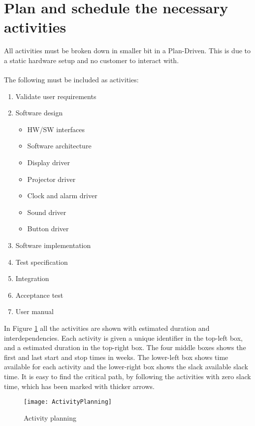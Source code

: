 \documentclass[Main]{subfiles}
\begin{document}
\section{Plan and schedule the necessary activities} 

All activities must be broken down in smaller bit in a Plan-Driven.
This is due to a static hardware setup and no customer to interact with.
\\
\\
The following must be included as activities:
\begin{enumerate}
	\item Validate user requirements
	\item Software design
	\begin{itemize}
		\item HW/SW interfaces
		\item Software architecture
		\item Display driver
		\item Projector driver
		\item Clock and alarm driver
		\item Sound driver
		\item Button driver
	\end{itemize}
	\item Software implementation
	\item Test specification
	\item Integration
	\item Acceptance test
	\item User manual
\end{enumerate}

In Figure \ref{fig:activityPlanning} all the activities are shown with estimated duration and interdependencies. Each activity is given a unique identifier in the top-left box, and a estimated duration in the top-right box. 
The four middle boxes shows the first and last start and stop times in weeks. 
The lower-left box shows time available for each activity and the lower-right box shows the slack available slack time. 
It is easy to find the critical path, by following the activities with zero slack time, which has been marked with thicker arrows.

\begin{figure}[hbtp]
\centering
\texttt{[image: ActivityPlanning]}
\caption{Activity planning}
\label{fig:activityPlanning}
\end{figure}
\end{document}
